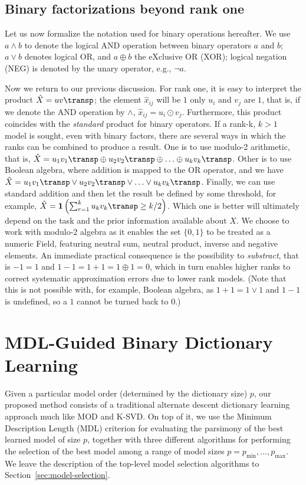 \documentclass[twocolumn]{IEEEtran}
\begin{document}
\subsection{Binary factorizations beyond rank one}

\def\xor{\oplus}

Let us now formalize the notation used for binary operations hereafter. We use $a \land b$ to denote the logical AND operation between binary operators $a$ and $b$; $a \lor b$ denotes logical OR, and $a \xor b$ the eXclusive OR (XOR); logical negation (NEG) is denoted by the unary operator, e.g., $\neg a$.
 
Now we return to our previous discussion. For rank one, it is easy to interpret the product $\hat{X}=uv\transp$; the element $\hat{x}_{ij}$ will be $1$ only $u_i$ and $v_j$ are $1$, that is, if we denote the AND operation by $\land$,  $\hat{x}_{ij} = u_i \odot v_j$. Furthermore, this product coincides with the \emph{standard} product for binary operators. If a rank-k, $k>1$ model is sought, even with binary factors, there are several ways in which the ranks can be combined to produce a result. One is to use modulo-2 arithmetic, that is, $\hat{X} = u_1v_1\transp \oplus u_2v_2\transp \oplus \ldots \oplus u_kv_k\transp$. Other is to use Boolean algebra, where addition is mapped to the OR operator, and we have $\hat{X} = u_1v_1\transp \lor u_2v_2\transp \lor \ldots \lor u_kv_k\transp$. Finally, we can use standard addition and then let the result be defined by some threshold, for example,
$\hat{X} = \indicator\left(\sum_{r=1}^k u_kv_k\transp \geq k/2 \right)$.
Which one is better will ultimately depend on the task and the prior information available about $X$. We choose to work with modulo-2 algebra as it enables the set $\{0,1\}$ to be treated as a numeric Field, featuring neutral sum, neutral product, inverse and negative elements. An immediate practical consequence is the possibility to \emph{substract}, that is $-1=1$ and $1 - 1 = 1 + 1 = 1 \oplus 1 = 0$, which in turn enables higher ranks to correct systematic approximation errors due to lower rank models. (Note that this is not possible with, for example, Boolean algebra, as $1+1=1\lor 1$ and $1-1$ is undefined, so a $1$ cannot be turned back to $0$.)

\section{MDL-Guided Binary Dictionary Learning}

Given a particular model order (determined by the dictionary size) $p$, our proposed method consists of a traditional alternate descent dictionary learning approach much like MOD and K-SVD. On top of it, we use the Minimum Description Length (MDL) criterion for evaluating the parsimony of the best learned model of size $p$, together with  three different algorithms for performing the selection of the best model among a range of model sizes $p=p_{\min},\ldots,p_{\max}$. We leave the description of the top-level model selection algorithms to Section~\ref{sec:model-selection}.
\end{document}
